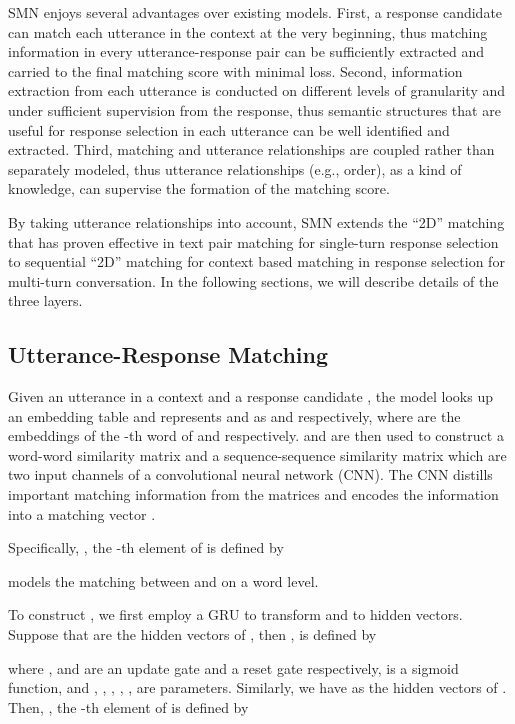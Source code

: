 \documentclass[11pt,a4paper]{article}
\begin{document}
	SMN enjoys several advantages over existing models. First, a response candidate can match each utterance in the context at the very beginning, thus matching information in every utterance-response pair can be sufficiently extracted and carried to the final matching score with minimal loss. Second, information extraction from each utterance is conducted on different levels of granularity and under sufficient supervision from the response, thus semantic structures that are useful for response selection in each utterance can be well identified and extracted. Third, matching and utterance relationships are coupled rather than separately modeled, thus utterance relationships (e.g., order), as a kind of knowledge, can supervise the formation of the matching score.  
	
	By taking utterance relationships into account, SMN extends the ``2D'' matching that has proven effective in text pair matching for single-turn response selection to sequential ``2D'' matching for context based matching in response selection for multi-turn conversation. In the following sections, we will describe details of the three layers. 
	
	\subsection{Utterance-Response Matching}\label{multi-channel}
	Given an utterance  in a context  and a response candidate , the model looks up an embedding table and represents  and  as  and  respectively, where  are the embeddings of the -th word of  and  respectively. 
	  and    are then used to construct a word-word similarity matrix    and a sequence-sequence similarity matrix    which are two input channels of a convolutional neural network (CNN). The CNN distills important matching information from the matrices and encodes the information into a matching vector . 
	
	Specifically, , the -th element of  is defined by
	
	 models the matching between  and  on a word level. 
	
	To construct , we first employ a GRU to transform  and  to hidden vectors. Suppose that  are the hidden vectors of , then ,  is defined by 
	
	\small	 
	
	\normalsize	 	 
	where ,  and  are an update gate and a reset gate respectively,  is a sigmoid function, and , , , , , are parameters. Similarly, we have  as the hidden vectors of . 
	Then, ,  the -th element of  is defined by
		 
\end{document}
